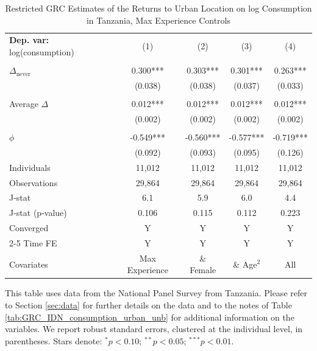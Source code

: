 \begin{table}[htbp] \centering \begin{threeparttable}
 \caption{Restricted GRC Estimates of the Returns to Urban Location on log Consumption in Tanzania, Max Experience Controls} 
 \label{tab:GRC_TZA_consumption_urban_unb_exp_max} 
\begin{tabular}{l cccc} \toprule  \textbf{Dep. var:}  log(consumption) 
                    &\multicolumn{1}{c}{(1)}   &\multicolumn{1}{c}{(2)}   &\multicolumn{1}{c}{(3)}   &\multicolumn{1}{c}{(4)}   \\
                    &               &               &               &               \\
\addlinespace
$\Delta_{\text{never}}$&       0.300***&       0.303***&       0.301***&       0.263***\\
                    &     (0.038)   &     (0.038)   &     (0.037)   &     (0.033)   \\
                    &               &               &               &               \\
\addlinespace
Average $\Delta$    &       0.012***&       0.012***&       0.012***&       0.012***\\
                    &     (0.002)   &     (0.002)   &     (0.002)   &     (0.002)   \\
                    &               &               &               &               \\
\addlinespace
$\phi$              &      -0.549***&      -0.560***&      -0.577***&      -0.719***\\
                    &     (0.092)   &     (0.093)   &     (0.095)   &     (0.126)   \\
\addlinespace
Individuals         &      11,012   &      11,012   &      11,012   &      11,012   \\
Observations        &      29,864   &      29,864   &      29,864   &      29,864   \\
J-stat              &         6.1   &         5.9   &         6.0   &         4.4   \\
J-stat (p-value)    &       0.106   &       0.115   &       0.112   &       0.223   \\
Converged           &           Y   &           Y   &           Y   &           Y   \\
\cmidrule{2-5} Time FE & Y & Y & Y & Y \\ Covariates & Max Experience & \& Female & \& Age$^2$ & All \\ \bottomrule \end{tabular} \begin{tablenotes}[flushleft] \footnotesize \item{This table uses data from the National Panel Survey from Tanzania. Please refer to Section \ref{sec:data} for further details on the data and to the notes of Table \ref{tab:GRC_IDN_consumption_urban_unb} for additional information on the variables. We report robust standard errors, clustered at the individual level, in parentheses. Stars denote: $^{*} p<0.10$; $^{**} p<0.05$; $^{***} p<0.01$.} \end{tablenotes} \end{threeparttable} \end{table}
